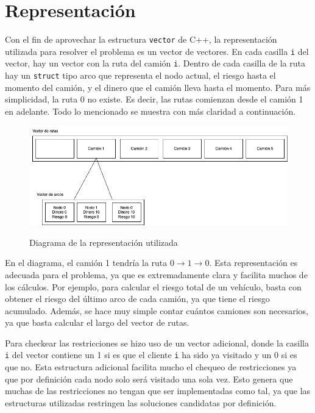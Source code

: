 \documentclass{article}
\begin{document}
\section{Representaci\'on}
Con el fin de aprovechar la estructura \texttt{vector} de C++, la representación utilizada para resolver el problema es un vector de vectores. En cada casilla \texttt{i} del vector, hay un vector con la ruta del camión \texttt{i}. Dentro de cada casilla de la ruta hay un \texttt{struct} tipo arco que representa el nodo actual, el riesgo hasta el momento del camión, y el dinero que el camión lleva hasta el momento. Para más simplicidad, la ruta 0 no existe. Es decir, las rutas comienzan desde el camión 1 en adelante. Todo lo mencionado se muestra con más claridad a continuación.
\begin{center}
    \begin{figure}[H]
        \includegraphics[scale = 0.5]{images/vectores.png}
        \label{fig: representación}
        \caption{Diagrama de la representación utilizada}
    \end{figure}
\end{center}

En el diagrama, el camión 1 tendría la ruta $0 \rightarrow 1 \rightarrow 0$. Esta representación es adecuada para el problema, ya que es extremadamente clara y facilita muchos de los cálculos. Por ejemplo, para calcular el riesgo total de un vehículo, basta con obtener el riesgo del último arco de cada camión, ya que tiene el riesgo acumulado. Además, se hace muy simple contar cuántos camiones son necesarios, ya que basta calcular el largo del vector de rutas. 

Para checkear las restricciones se hizo uso de un vector adicional, donde la casilla \texttt{i} del vector contiene un 1 si es que el cliente \texttt{i} ha sido ya visitado y un $0$ si es que no. Esta estructura adicional facilita mucho el chequeo de restricciones ya que por definición cada nodo solo será visitado una sola vez. Esto genera que muchas de las restricciones no tengan que ser implementadas como tal, ya que las estructuras utilizadas restringen las soluciones candidatas por definición. 
\end{document}
